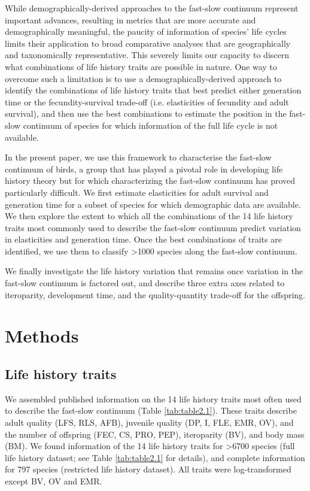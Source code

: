While demographically-derived approaches to the fast-slow continuum represent
important advances, resulting in metrics that are more accurate and
demographically meaningful, the paucity of information of species’ life cycles
limits their application to broad comparative analyses that are geographically
and taxonomically representative. This severely limits our capacity to discern
what combinations of life history traits are possible in nature. One way to
overcome such a limitation is to use a demographically-derived approach to
identify the combinations of life history traits that best predict either
generation time or the fecundity-survival trade-off (i.e. elasticities of
fecundity and adult survival), and then use the best combinations to estimate
the position in the fast-slow continuum of species for which information of the
full life cycle is not available.

In the present paper, we use this framework to characterise the fast-slow
continuum of birds, a group that has played a pivotal role in developing life
history theory but for which characterizing the fast-slow continuum has proved
particularly difficult. We first estimate elasticities for adult survival and
generation time for a subset of species for which demographic data are
available. We then explore the extent to which all the combinations of the 14
life history traits most commonly used to describe the fast-slow continuum 
predict variation in elasticities and generation time. Once the best 
combinations of traits are identified, we use them to classify 
\textgreater{1000} species along the fast-slow continuum.

We finally investigate the life history variation that remains once variation
in the fast-slow continuum is factored out, and describe three extra axes
related to iteroparity, development time, and the quality-quantity trade-off for
the offspring.


\section{Methods}

\subsection*{Life history traits}

We assembled published information on the 14 life history traits most often used
to describe the fast-slow continuum (Table \ref{tab:table2.1}). These traits
describe adult quality (LFS, RLS, AFB), juvenile quality (DP, I, FLE, EMR,
OV), and the number of offspring (FEC, CS, PRO, PEP), iteroparity (BV), and body
mass (BM). We found information of the 14 life history traits for 
\textgreater{6700} species (full life history dataset; see Table 
\ref{tab:table2.1} for details), and complete information for 797 species 
(restricted life history dataset). All traits were log-transformed except BV, 
OV and EMR.


